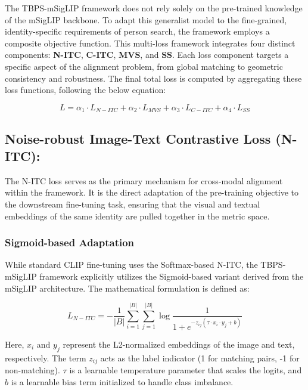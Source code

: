 \documentclass[../main.tex]{subfiles}
\begin{document}
The TBPS-mSigLIP framework does not rely solely on the pre-trained knowledge of the mSigLIP backbone. To adapt this generalist model to the fine-grained, identity-specific requirements of person search, the framework employs a composite objective function. This multi-loss framework integrates four distinct components: \textbf{N-ITC}, \textbf{C-ITC}, \textbf{MVS}, and \textbf{SS}. Each loss component targets a specific aspect of the alignment problem, from global matching to geometric consistency and robustness. The final total loss is computed by aggregating these loss functions, following the below equation:

\begin{equation}
    L = \alpha_1 \cdot L_{N-ITC} + \alpha_2 \cdot L_{MVS} + \alpha_3 \cdot L_{C-ITC} + \alpha_4 \cdot L_{SS}
\end{equation}

\subsection{Noise-robust Image-Text Contrastive Loss (N-ITC):}

The N-ITC loss serves as the primary mechanism for cross-modal alignment within the framework. It is the direct adaptation of the pre-training objective to the downstream fine-tuning task, ensuring that the visual and textual embeddings of the same identity are pulled together in the metric space.

\subsubsection{Sigmoid-based Adaptation}

While standard CLIP fine-tuning uses the Softmax-based N-ITC, the TBPS-mSigLIP framework explicitly utilizes the Sigmoid-based variant derived from the mSigLIP architecture. The mathematical formulation is defined as:

\begin{equation}
    L_{N-ITC} = - \frac{1}{|B|} \sum_{i=1}^{|B|} \sum_{j=1}^{|B|} \log \frac{1}{1 + e^{-z_{ij}(\tau \cdot x_i \cdot y_j + b)}}
\end{equation}

Here, $x_i$ and $y_j$ represent the L2-normalized embeddings of the image and text, respectively. The term $z_{ij}$ acts as the label indicator (1 for matching pairs, -1 for non-matching). $\tau$ is a learnable temperature parameter that scales the logits, and $b$ is a learnable bias term initialized to handle class imbalance.
\end{document}
